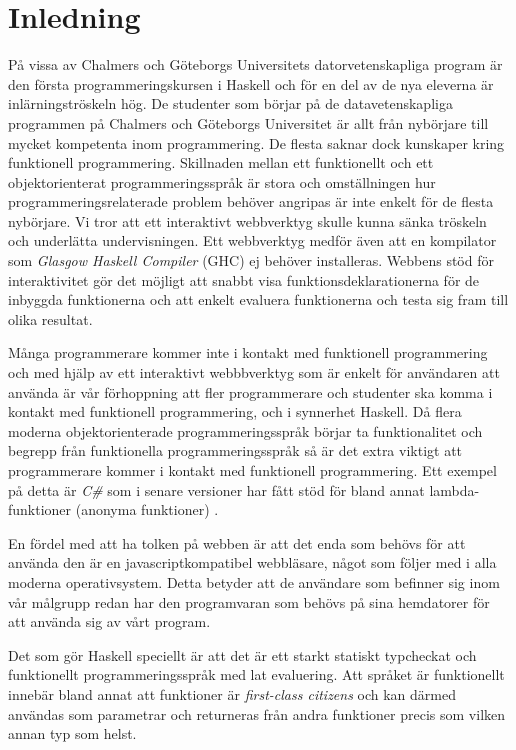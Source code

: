 \section{Inledning}
På vissa av Chalmers och Göteborgs Universitets datorvetenskapliga program är den första programmeringskursen i Haskell \citep{haskell98} och för en del av de nya eleverna är inlärningströskeln hög. De studenter som börjar på de datavetenskapliga programmen på Chalmers och Göteborgs Universitet är allt från nybörjare till mycket kompetenta inom programmering. De flesta saknar dock kunskaper kring funktionell programmering. Skillnaden mellan ett funktionellt och ett objektorienterat programmeringsspråk är stora och omställningen hur programmeringsrelaterade problem behöver angripas  är inte enkelt för de flesta nybörjare. Vi tror att ett interaktivt webbverktyg skulle kunna sänka tröskeln och underlätta undervisningen. Ett webbverktyg medför även att en kompilator som \emph{Glasgow Haskell Compiler} (GHC) \citep{ghc} ej behöver installeras. Webbens stöd för interaktivitet gör det möjligt att snabbt visa funktionsdeklarationerna för de inbyggda funktionerna och att enkelt evaluera funktionerna och testa sig fram till olika resultat.

Många programmerare kommer inte i kontakt med funktionell programmering  och med hjälp av ett interaktivt webbbverktyg som är enkelt för användaren att använda är vår förhoppning att fler programmerare och studenter ska komma i kontakt med funktionell programmering, och i synnerhet Haskell. Då flera moderna objektorienterade programmeringsspråk börjar ta funktionalitet och begrepp från funktionella programmeringsspråk så är det extra viktigt att programmerare kommer i kontakt med funktionell programmering. Ett exempel på detta är \emph{C\#} som i senare versioner har fått stöd för bland annat lambda-funktioner (anonyma funktioner) \citep{csharp}. 

En fördel med att ha tolken på webben är att det enda som behövs för att använda den är en javascriptkompatibel webbläsare, något som följer med i alla moderna operativsystem. Detta betyder att de användare som befinner sig inom vår målgrupp redan har den programvaran som behövs på sina hemdatorer för att använda sig av vårt program.  

Det som gör Haskell speciellt är att det är ett starkt statiskt typcheckat och funktionellt programmeringsspråk med lat evaluering. %
Att språket är funktionellt innebär bland annat att funktioner är \emph{first-class citizens} och kan därmed användas som parametrar och returneras från andra funktioner precis som vilken annan typ som helst.

